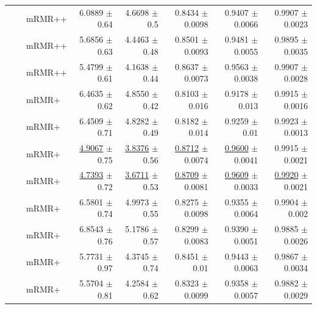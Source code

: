 \begin{longtable}{llp{}rrrrr}
 &  & mRMR++ & 6.0889 {\scriptsize $\pm$ 0.64} & 4.6698 {\scriptsize $\pm$ 0.5} & 0.8434 {\scriptsize $\pm$ 0.0098} & 0.9407 {\scriptsize $\pm$ 0.0066} & 0.9907 {\scriptsize $\pm$ 0.0023} \\
 &  & mRMR++ & 5.6856 {\scriptsize $\pm$ 0.63} & 4.4463 {\scriptsize $\pm$ 0.48} & 0.8501 {\scriptsize $\pm$ 0.0093} & 0.9481 {\scriptsize $\pm$ 0.0055} & 0.9895 {\scriptsize $\pm$ 0.0035} \\
 &  & mRMR++ & 5.4799 {\scriptsize $\pm$ 0.61} & 4.1638 {\scriptsize $\pm$ 0.44} & 0.8637 {\scriptsize $\pm$ 0.0073} & 0.9563 {\scriptsize $\pm$ 0.0038} & 0.9907 {\scriptsize $\pm$ 0.0028} \\
 &  & mRMR+ & 6.4635 {\scriptsize $\pm$ 0.62} & 4.8550 {\scriptsize $\pm$ 0.42} & 0.8103 {\scriptsize $\pm$ 0.016} & 0.9178 {\scriptsize $\pm$ 0.013} & 0.9915 {\scriptsize $\pm$ 0.0016} \\
 &  & mRMR+ & 6.4509 {\scriptsize $\pm$ 0.71} & 4.8282 {\scriptsize $\pm$ 0.49} & 0.8182 {\scriptsize $\pm$ 0.014} & 0.9259 {\scriptsize $\pm$ 0.01} & 0.9923 {\scriptsize $\pm$ 0.0013} \\
 &  & mRMR+ & \underline{4.9067} {\scriptsize $\pm$ 0.75} & \underline{3.8376} {\scriptsize $\pm$ 0.56} & \underline{0.8712} {\scriptsize $\pm$ 0.0074} & \underline{0.9600} {\scriptsize $\pm$ 0.0041} & 0.9915 {\scriptsize $\pm$ 0.0021} \\
 &  & mRMR+ & \underline{4.7393} {\scriptsize $\pm$ 0.72} & \underline{3.6711} {\scriptsize $\pm$ 0.53} & \underline{0.8709} {\scriptsize $\pm$ 0.0081} & \underline{0.9609} {\scriptsize $\pm$ 0.0033} & \underline{0.9920} {\scriptsize $\pm$ 0.0021} \\
 &  & mRMR+ & 6.5801 {\scriptsize $\pm$ 0.74} & 4.9973 {\scriptsize $\pm$ 0.55} & 0.8275 {\scriptsize $\pm$ 0.0098} & 0.9355 {\scriptsize $\pm$ 0.0064} & 0.9904 {\scriptsize $\pm$ 0.002} \\
 &  & mRMR+ & 6.8543 {\scriptsize $\pm$ 0.76} & 5.1786 {\scriptsize $\pm$ 0.57} & 0.8299 {\scriptsize $\pm$ 0.0083} & 0.9390 {\scriptsize $\pm$ 0.0051} & 0.9885 {\scriptsize $\pm$ 0.0026} \\
 &  & mRMR+ & 5.7731 {\scriptsize $\pm$ 0.97} & 4.3745 {\scriptsize $\pm$ 0.74} & 0.8451 {\scriptsize $\pm$ 0.01} & 0.9443 {\scriptsize $\pm$ 0.0063} & 0.9867 {\scriptsize $\pm$ 0.0034} \\
 &  & mRMR+ & 5.5704 {\scriptsize $\pm$ 0.81} & 4.2584 {\scriptsize $\pm$ 0.62} & 0.8323 {\scriptsize $\pm$ 0.0099} & 0.9358 {\scriptsize $\pm$ 0.0057} & 0.9882 {\scriptsize $\pm$ 0.0029} \\

\end{longtable}
